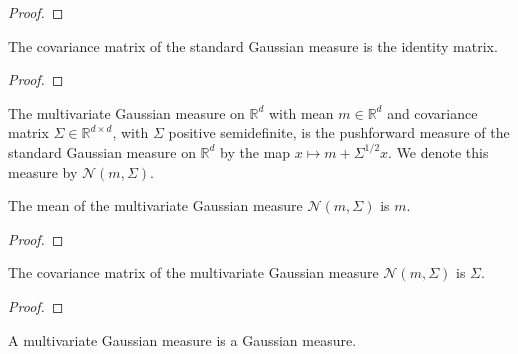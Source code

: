 \begin{proof}\leanok

\end{proof}


\begin{lemma}\label{lem:covMatrix_stdGaussian}
The covariance matrix of the standard Gaussian measure is the identity matrix.
\end{lemma}

\begin{proof}

\end{proof}


\begin{definition}\label{def:multivariateGaussian}
  \leanok
The multivariate Gaussian measure on $\mathbb{R}^d$ with mean $m \in \mathbb{R}^d$ and covariance matrix $\Sigma \in \mathbb{R}^{d \times d}$, with $\Sigma$ positive semidefinite, is the pushforward measure of the standard Gaussian measure on $\mathbb{R}^d$ by the map $x \mapsto m + \Sigma^{1/2} x$.
We denote this measure by $\mathcal{N}(m, \Sigma)$.
\end{definition}


\begin{lemma}\label{lem:integral_id_multivariateGaussian}
The mean of the multivariate Gaussian measure $\mathcal{N}(m, \Sigma)$ is $m$.
\end{lemma}

\begin{proof}

\end{proof}


\begin{lemma}\label{lem:covMatrix_multivariateGaussian}
The covariance matrix of the multivariate Gaussian measure $\mathcal{N}(m, \Sigma)$ is $\Sigma$.
\end{lemma}

\begin{proof}

\end{proof}


\begin{lemma}\label{lem:isGaussian_multivariateGaussian}
  \leanok
A multivariate Gaussian measure is a Gaussian measure.
\end{lemma}

